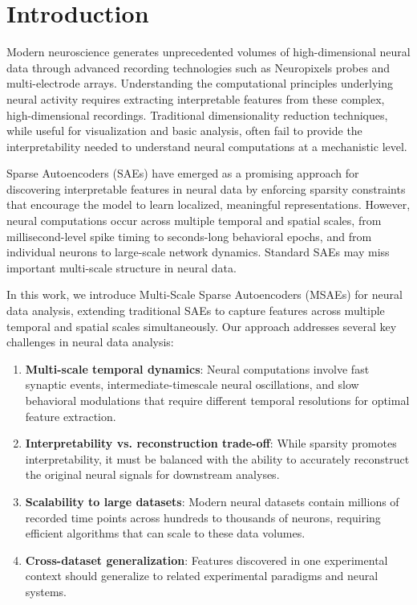 \section{Introduction}

Modern neuroscience generates unprecedented volumes of high-dimensional neural data through advanced recording technologies such as Neuropixels probes and multi-electrode arrays. Understanding the computational principles underlying neural activity requires extracting interpretable features from these complex, high-dimensional recordings. Traditional dimensionality reduction techniques, while useful for visualization and basic analysis, often fail to provide the interpretability needed to understand neural computations at a mechanistic level.

Sparse Autoencoders (SAEs) have emerged as a promising approach for discovering interpretable features in neural data by enforcing sparsity constraints that encourage the model to learn localized, meaningful representations. However, neural computations occur across multiple temporal and spatial scales, from millisecond-level spike timing to seconds-long behavioral epochs, and from individual neurons to large-scale network dynamics. Standard SAEs may miss important multi-scale structure in neural data.

In this work, we introduce Multi-Scale Sparse Autoencoders (MSAEs) for neural data analysis, extending traditional SAEs to capture features across multiple temporal and spatial scales simultaneously. Our approach addresses several key challenges in neural data analysis:

\begin{enumerate}
\item \textbf{Multi-scale temporal dynamics}: Neural computations involve fast synaptic events, intermediate-timescale neural oscillations, and slow behavioral modulations that require different temporal resolutions for optimal feature extraction.

\item \textbf{Interpretability vs. reconstruction trade-off}: While sparsity promotes interpretability, it must be balanced with the ability to accurately reconstruct the original neural signals for downstream analyses.

\item \textbf{Scalability to large datasets}: Modern neural datasets contain millions of recorded time points across hundreds to thousands of neurons, requiring efficient algorithms that can scale to these data volumes.

\item \textbf{Cross-dataset generalization}: Features discovered in one experimental context should generalize to related experimental paradigms and neural systems.
\end{enumerate}

